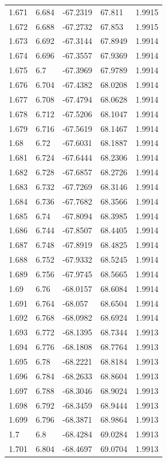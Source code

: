 \begin{tabular}{lllll}
1.671 & 6.684 & -67.2319 & 67.811 & 1.9915 \\
1.672 & 6.688 & -67.2732 & 67.853 & 1.9915 \\
1.673 & 6.692 & -67.3144 & 67.8949 & 1.9914 \\
1.674 & 6.696 & -67.3557 & 67.9369 & 1.9914 \\
1.675 & 6.7 & -67.3969 & 67.9789 & 1.9914 \\
1.676 & 6.704 & -67.4382 & 68.0208 & 1.9914 \\
1.677 & 6.708 & -67.4794 & 68.0628 & 1.9914 \\
1.678 & 6.712 & -67.5206 & 68.1047 & 1.9914 \\
1.679 & 6.716 & -67.5619 & 68.1467 & 1.9914 \\
1.68 & 6.72 & -67.6031 & 68.1887 & 1.9914 \\
1.681 & 6.724 & -67.6444 & 68.2306 & 1.9914 \\
1.682 & 6.728 & -67.6857 & 68.2726 & 1.9914 \\
1.683 & 6.732 & -67.7269 & 68.3146 & 1.9914 \\
1.684 & 6.736 & -67.7682 & 68.3566 & 1.9914 \\
1.685 & 6.74 & -67.8094 & 68.3985 & 1.9914 \\
1.686 & 6.744 & -67.8507 & 68.4405 & 1.9914 \\
1.687 & 6.748 & -67.8919 & 68.4825 & 1.9914 \\
1.688 & 6.752 & -67.9332 & 68.5245 & 1.9914 \\
1.689 & 6.756 & -67.9745 & 68.5665 & 1.9914 \\
1.69 & 6.76 & -68.0157 & 68.6084 & 1.9914 \\
1.691 & 6.764 & -68.057 & 68.6504 & 1.9914 \\
1.692 & 6.768 & -68.0982 & 68.6924 & 1.9914 \\
1.693 & 6.772 & -68.1395 & 68.7344 & 1.9913 \\
1.694 & 6.776 & -68.1808 & 68.7764 & 1.9913 \\
1.695 & 6.78 & -68.2221 & 68.8184 & 1.9913 \\
1.696 & 6.784 & -68.2633 & 68.8604 & 1.9913 \\
1.697 & 6.788 & -68.3046 & 68.9024 & 1.9913 \\
1.698 & 6.792 & -68.3459 & 68.9444 & 1.9913 \\
1.699 & 6.796 & -68.3871 & 68.9864 & 1.9913 \\
1.7 & 6.8 & -68.4284 & 69.0284 & 1.9913 \\
1.701 & 6.804 & -68.4697 & 69.0704 & 1.9913 \\

\end{tabular}
